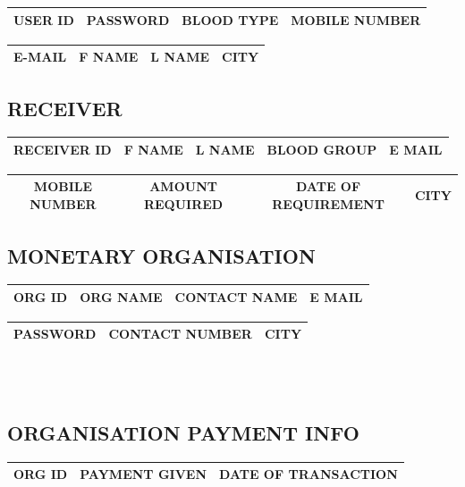 \begin{sloppypar}
\begin{tabular}{ | c | c | c | c | }
 \hline
 USER ID & PASSWORD & BLOOD TYPE & MOBILE NUMBER \\
 \hline
\end{tabular}
\begin{tabular}{ | c | c | c | c | }
 \hline
 E-MAIL & F NAME & L NAME & CITY \\
 \hline
\end{tabular}

\subsection{RECEIVER}

\begin{tabular}{ | c | c | c | c | c | }
 \hline
 RECEIVER ID & F NAME & L NAME & BLOOD GROUP & E MAIL \\
 \hline
\end{tabular}
\begin{tabular}{ | c | c | c | c | }
 \hline
 MOBILE NUMBER & AMOUNT REQUIRED & DATE OF REQUIREMENT & CITY \\
 \hline
\end{tabular}

\subsection{MONETARY ORGANISATION}

\begin{tabular}{ | c | c | c | c | }
 \hline
 ORG ID & ORG NAME & CONTACT NAME & E MAIL \\
 \hline
\end{tabular}

\begin{tabular}{ | c | c | c | }
 \hline
 PASSWORD & CONTACT NUMBER & CITY \\
 \hline
\end{tabular} \\ \\

\subsection{ORGANISATION PAYMENT INFO}

\begin{tabular}{ | c | c | c | }
 \hline
 ORG ID & PAYMENT GIVEN & DATE OF TRANSACTION \\
 \hline
\end{tabular}


\end{sloppypar}
